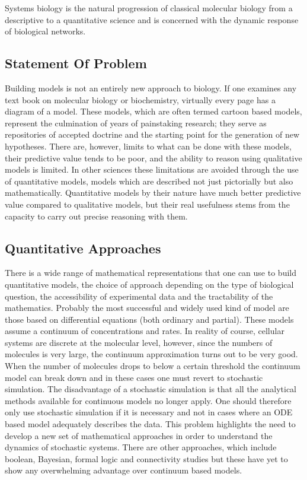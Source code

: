 Systems biology is the natural progression of classical molecular
biology from a descriptive to a quantitative science and is concerned
with the dynamic response of biological networks.

\subsection{Statement Of Problem}

Building models is not an entirely new approach to biology. If one
examines any text book on molecular biology or biochemistry, virtually
every page has a diagram of a model. These models, which are often
termed cartoon based models, represent the culmination of years of
painstaking research; they serve as repositories of accepted doctrine
and the starting point for the generation of new hypotheses. There are,
however, limits to what can be done with these models, their predictive
value tends to be poor, and the ability to reason using qualitative
models is limited. In other sciences these limitations are avoided
through the use of quantitative models, models which are described not
just pictorially but also mathematically. Quantitative models by their
nature have much better predictive value compared to qualitative models,
but their real usefulness stems from the capacity to carry out precise
reasoning with them.

\subsection{Quantitative Approaches}

There is a wide range of mathematical representations that one can use
to build quantitative models, the choice of approach depending on the
type of biological question, the accessibility of experimental data and
the tractability of the mathematics. Probably the most successful and
widely used kind of model are those based on differential equations
(both ordinary and partial). These models assume a continuum of
concentrations and rates. In reality of course, cellular systems are
discrete at the molecular level, however, since the numbers of molecules
is very large, the continuum approximation turns out to be very good.
When the number of molecules drops to below a certain threshold the
continuum model can break down and in these cases one must revert to
stochastic simulation. The disadvantage of a stochastic simulation is
that all the analytical methods available for continuous models no
longer apply. One should therefore only use stochastic simulation if it
is necessary and not in cases where an ODE based model adequately
describes the data. This problem highlights the need to develop a new
set of mathematical approaches in order to understand the dynamics of
stochastic systems. There are other approaches, which include boolean,
Bayesian, formal logic and connectivity studies but these have yet to
show any overwhelming advantage over continuum based models.

